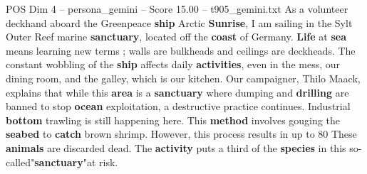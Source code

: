 \begin{textsample}{POS Dim 4 – persona\_gemini – Score 15.00 – t905\_gemini.txt}  \label{ex:f4_pos_047}
As a volunteer deckhand aboard the Greenpeace \textbf{ship} Arctic \textbf{Sunrise}, I am sailing in the Sylt Outer Reef marine \textbf{sanctuary}, located off the \textbf{coast} of Germany. \textbf{Life} at \textbf{sea} means learning new terms ; walls are bulkheads and ceilings are deckheads.
The constant wobbling of the \textbf{ship} affects daily \textbf{activities}, even in the mess, our dining room, and the galley, which is our kitchen.
Our campaigner, Thilo Maack, explains that while this \textbf{area} is a \textbf{sanctuary} where dumping and \textbf{drilling} are banned to stop \textbf{ocean} exploitation, a destructive practice continues.
Industrial \textbf{bottom} trawling is still happening here.
This \textbf{method} involves gouging the \textbf{seabed} to \textbf{catch} brown shrimp.
However, this process results in up to 80 %
These \textbf{animals} are discarded dead.
The \textbf{activity} puts a third of the \textbf{species} in this so-called"\textbf{sanctuary}"at risk.

\end{textsample}
